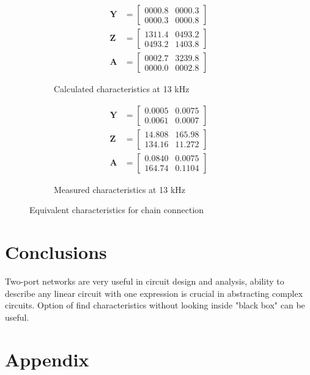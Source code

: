 \documentclass[notitlepage, a4paper, 11pt]{article}
\begin{document}
	\begin{figure}[H]
		\begin{subfigure}{0.45\textwidth}
			\begin{align*}
				\mathbf{Y} &= 
				\begin{bmatrix}
					0000.8  &  0000.3 \\
					0000.3  &  0000.8
				\end{bmatrix}
				\\
				\mathbf{Z} &= 
				\begin{bmatrix}
				    1311.4 &   0493.2 \\
					0493.2 &   1403.8
				\end{bmatrix}
				\\
				\mathbf{A} &= 
				\begin{bmatrix}
					0002.7  &  3239.8 \\
					0000.0  &  0002.8
				\end{bmatrix}
			\end{align*}
			\caption{Calculated characteristics at 13 kHz}
		\end{subfigure}
		\hfill
		\begin{subfigure}{0.45\textwidth}
			\begin{align*}
				\mathbf{Y} &= 
				\begin{bmatrix}
					    0.0005   & 0.0075 \\
					0.0061   & 0.0007
				\end{bmatrix}
				\\
				\mathbf{Z} &= 
				\begin{bmatrix}
					   14.808 & 165.98\\
					134.16  & 11.272
				\end{bmatrix}
				\\
				\mathbf{A} &=
				\begin{bmatrix}
					    0.0840 &   0.0075\\
					164.74  &  0.1104
				\end{bmatrix} 
			\end{align*}
			\caption{Measured characteristics at 13 kHz}
		\end{subfigure}
		\caption{Equivalent characteristics for chain connection}
	\end{figure}
	
	\section{Conclusions}
	Two-port networks are very useful in circuit design and analysis, ability to describe any linear circuit with one expression is crucial in abstracting complex circuits. Option of find characteristics without looking inside "black box" can be useful.
	
	\newpage
	\appendix
	\section{Appendix}
	\inputminted{matlab}{../Matlab/main.m}
	\inputminted{matlab}{../Matlab/import_csv.m}
	\inputminted{matlab}{../Matlab/Y_to_Z.m}
	\inputminted{matlab}{../Matlab/chain_to_Z.m}
	\inputminted{matlab}{../Matlab/Z_to_admittance.m}
	\inputminted{matlab}{../Matlab/Z_to_chain.m}
	
\end{document}
